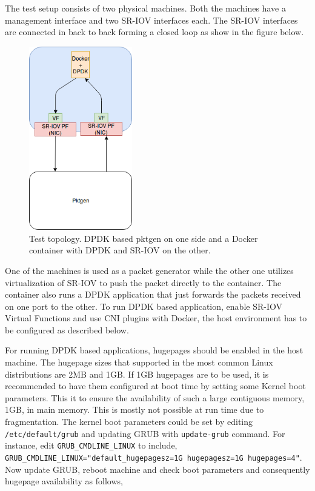 \documentclass[english, 12pt, a4paper, elec, utf8, a-1b, online]{aaltothesis}
\begin{document}
The test setup consists of two physical machines. Both the machines have a management interface and two SR-IOV interfaces each. The SR-IOV interfaces are connected in back to back forming a closed loop as show in the figure below.
\begin{figure}[htb]
\begin{center}
\includegraphics[height=8cm]{pics/ContainerOnDPDKandSRIOV.png}
\end{center}
\caption{Test topology. DPDK based pktgen on one side and a Docker container with DPDK and SR-IOV on the other.}
\label{liitekuva}
\end{figure}

One of the machines is used as a packet generator while the other one utilizes virtualization of SR-IOV to push the packet directly to the container. The container also runs a DPDK application that just forwards the packets received on one port to the other. To run DPDK based application, enable SR-IOV Virtual Functions and use CNI plugins with Docker, the host environment has to be configured as described below.

For running DPDK based applications, hugepages should be enabled in the host machine. The hugepage sizes that supported in the most common Linux distributions are 2MB and 1GB. If 1GB hugepages are to be used, it is recommended to have them configured at boot time by setting some Kernel boot parameters. This it to ensure the availability of such a large contiguous memory, 1GB, in main memory. This is mostly not possible at run time due to fragmentation. The kernel boot parameters could be set by editing \lstinline{/etc/default/grub} and updating GRUB with \lstinline{update-grub} command. For instance, edit \lstinline{GRUB_CMDLINE_LINUX} to include, \lstinline{GRUB_CMDLINE_LINUX="default_hugepagesz=1G hugepagesz=1G hugepages=4"}. Now update GRUB, reboot machine and check boot parameters and consequently hugepage availability as follows,
\end{document}
